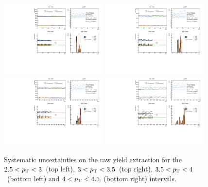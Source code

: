\begin{figure}
    \centering
    \includegraphics[width=0.48\textwidth]{Figures/Chapter 5/AllPtBins/RawYieldSyst2.5_3.pdf}
    \includegraphics[width=0.48\textwidth]{Figures/Chapter 5/AllPtBins/RawYieldSyst3_3.5.pdf}
    \includegraphics[width=0.48\textwidth]{Figures/Chapter 5/AllPtBins/RawYieldSyst3.5_4.pdf}
    \includegraphics[width=0.48\textwidth]{Figures/Chapter 5/AllPtBins/RawYieldSyst4_4.5.pdf}
    \caption{Systematic uncertainties on the raw yield extraction for the $2.5 < p_\mathrm{T} < 3$~\gevc (top left), $3 < p_\mathrm{T} < 3.5$~\gevc (top right), $3.5 < p_\mathrm{T} < 4$~\gevc (bottom left) and $4 < p_\mathrm{T} < 4.5$~\gevc (bottom right) intervals.}
\end{figure}

